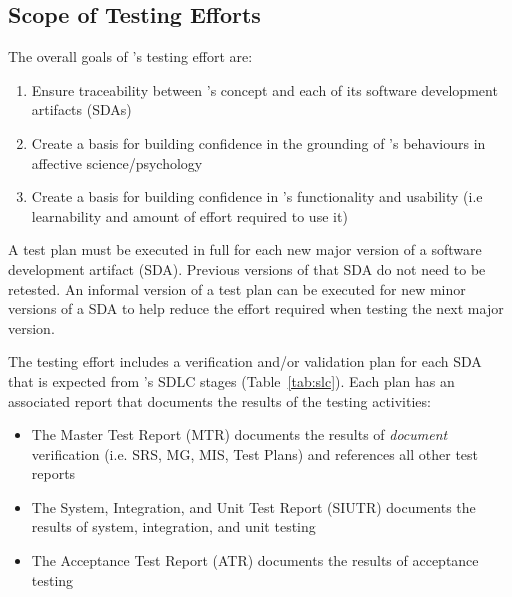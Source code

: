 \subsection{Scope of Testing Efforts}
The overall goals of \progname{}'s testing effort are:
\begin{enumerate}

    \item Ensure traceability between \progname{}'s concept and each of its
    software development artifacts (SDAs)

    \item Create a basis for building confidence in the grounding of
    \progname{}'s behaviours in affective science/psychology

    \item Create a basis for building confidence in \progname{}'s functionality
    and usability (i.e learnability and amount of effort required to use it)

\end{enumerate}

A test plan must be executed in full for each new major version of a software
development artifact (SDA). Previous versions of that SDA do not need to be
retested. An informal version of a test plan can be executed for new minor
versions of a SDA to help reduce the effort required when testing the next
major version.

The testing effort includes a verification and/or validation plan for each SDA
that is expected from \progname{}'s SDLC stages (Table~\ref{tab:slc}). Each
plan has an associated report that documents the results of the testing
activities:
\begin{itemize}

    \item The Master Test Report (MTR) documents the results of
    \textit{document} verification (i.e. SRS, MG, MIS, Test Plans) and
    references all other test reports

    \item The System, Integration, and Unit Test Report (SIUTR) documents the
    results of system, integration, and unit testing

    \item The Acceptance Test Report (ATR) documents the results of acceptance
    testing

\end{itemize}

